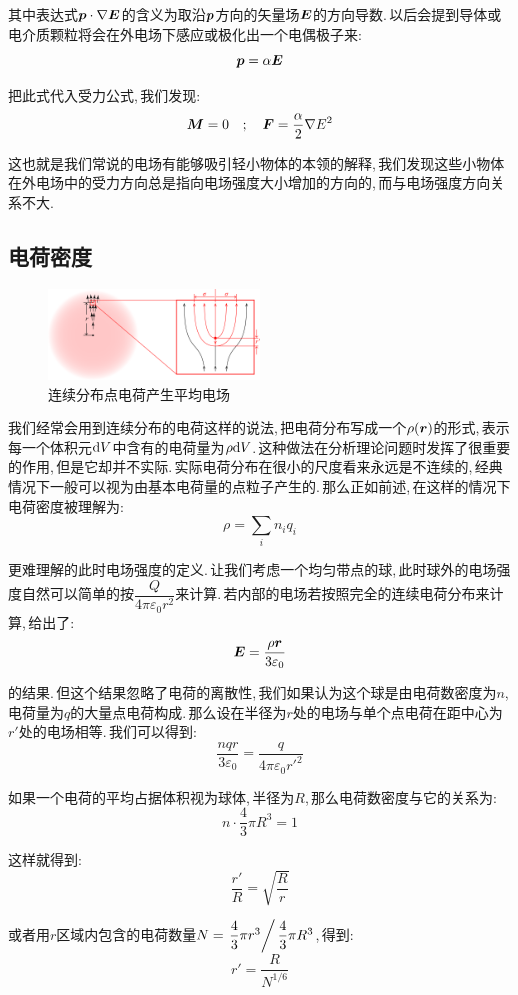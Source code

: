 其中表达式$\boldsymbol{p}\cdot\nabla\boldsymbol{E}$的含义为取沿$\boldsymbol{p}$方向的矢量场$\boldsymbol{E}$的方向导数.\,以后会提到导体或电介质颗粒将会在外电场下感应或极化出一个电偶极子来:
\[\boldsymbol{p}=\alpha \boldsymbol{E}\]

把此式代入受力公式,\,我们发现:
\[\boldsymbol{M}=0\quad;\quad \boldsymbol{F}=\frac{\alpha}{2}\nabla{E^2}\]

这也就是我们常说的电场有能够吸引轻小物体的本领的解释,\,我们发现这些小物体在外电场中的受力方向总是指向电场强度大小增加的方向的,\,而与电场强度方向关系不大.

\subsection{电荷密度}

\begin{figure}[H]
\centering
\includegraphics[width=0.5\textwidth]{image/7-1-14.png}
\caption{连续分布点电荷产生平均电场}
\end{figure}
我们经常会用到连续分布的电荷这样的说法,\,把电荷分布写成一个$\rho(\boldsymbol{r})$的形式,\,表示每一个体积元$\textrm{d} V$中含有的电荷量为$\rho\textrm{d} V$.\,这种做法在分析理论问题时发挥了很重要的作用,\,但是它却并不实际.\,实际电荷分布在很小的尺度看来永远是不连续的,\,经典情况下一般可以视为由基本电荷量的点粒子产生的.\,那么正如前述,\,在这样的情况下电荷密度被理解为:
\[\rho=\sum_i n_iq_i\]

更难理解的此时电场强度的定义.\,让我们考虑一个均匀带点的球,\,此时球外的电场强度自然可以简单的按$\dfrac{Q}{4\pi\varepsilon_0 r^2}$来计算.\,若内部的电场若按照完全的连续电荷分布来计算,\,给出了:
\[\boldsymbol{E}=\frac{\rho \boldsymbol{r}}{3\varepsilon_0}\]

的结果.\,但这个结果忽略了电荷的离散性,\,我们如果认为这个球是由电荷数密度为$n$,\,电荷量为$q$的大量点电荷构成.\,那么设在半径为$r$处的电场与单个点电荷在距中心为$r'$处的电场相等.\,我们可以得到:
\[\frac{nqr}{3\varepsilon_0}=\frac{q}{4\pi\varepsilon_0 r'^2}\]

如果一个电荷的平均占据体积视为球体,\,半径为$R$,\,那么电荷数密度与它的关系为:
\[n\cdot\frac{4}{3}\pi R^3=1\]

这样就得到:
\[\frac{r'}{R}=\sqrt{\frac{R}{r}}\]

或者用$r$区域内包含的电荷数量$N=\left.\dfrac{4}{3}\pi r^3\right/\dfrac{4}{3}\pi R^3$,\,得到:
\[r'=\frac{R}{N^{1/6}}\]

